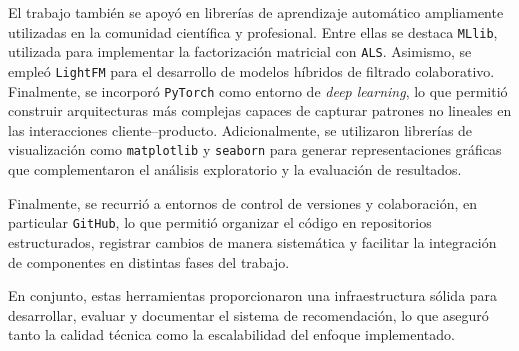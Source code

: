 El trabajo también se apoyó en librerías de aprendizaje automático ampliamente utilizadas en la comunidad científica y profesional. Entre ellas se destaca \texttt{MLlib}, utilizada para implementar la factorización matricial con \texttt{ALS}. Asimismo, se empleó \texttt{LightFM} para el desarrollo de modelos híbridos de filtrado colaborativo. Finalmente, se incorporó \texttt{PyTorch} como entorno de \textit{deep learning}, lo que permitió construir arquitecturas más complejas capaces de capturar patrones no lineales en las interacciones cliente–producto. Adicionalmente, se utilizaron librerías de visualización como \texttt{matplotlib} y \texttt{seaborn} para generar representaciones gráficas que complementaron el análisis exploratorio y la evaluación de resultados.

Finalmente, se recurrió a entornos de control de versiones y colaboración, en particular \texttt{GitHub}, lo que permitió organizar el código en repositorios estructurados, registrar cambios de manera sistemática y facilitar la integración de componentes en distintas fases del trabajo.

En conjunto, estas herramientas proporcionaron una infraestructura sólida para desarrollar, evaluar y documentar el sistema de recomendación, lo que aseguró tanto la calidad técnica como la escalabilidad del enfoque implementado.









